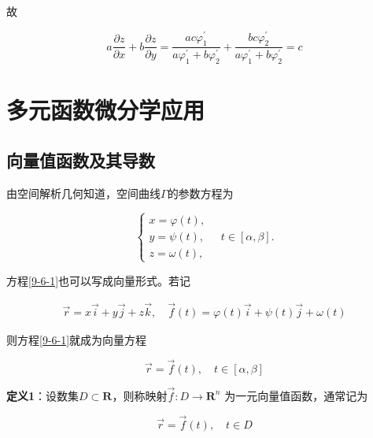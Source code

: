 \documentclass[12pt, a4paper]{article}
\numberwithin{equation}{section}
\begin{document}
    故

    $$
        a \frac{\partial z}{\partial x}+b \frac{\partial z}{\partial y}=
        \frac{a c \varphi_1^{\prime}}{a \varphi_1^{\prime}+b \varphi_2^{\prime}}+
        \frac{b c \varphi_2^{\prime}}{a \varphi_1^{\prime}+b \varphi_2^{\prime}}=c
    $$

\section{多元函数微分学应用}

\subsection{向量值函数及其导数}

    由空间解析几何知道，空间曲线\(\varGamma\)的参数方程为

    \begin{equation}
        \left\{\begin{array}{l}
            x=\varphi(t), \\
            y=\psi(t), \\
            z=\omega(t),
        \end{array} \quad t \in[\alpha, \beta]. \right.
        \label{9-6-1}
    \end{equation}

    方程\ref{9-6-1}也可以写成向量形式。若记

    \begin{align*}
        \overrightarrow{r} = x\overrightarrow{i} + y\overrightarrow{j} + z\overrightarrow{k}, \quad
        \overrightarrow{f}\left(t\right) = \varphi\left(t\right)\overrightarrow{i} +
            \psi\left(t\right)\overrightarrow{j} + \omega\left(t\right)
    \end{align*}

    则方程\ref{9-6-1}就成为向量方程

    \begin{equation}
        \overrightarrow{r} = \overrightarrow{f}\left(t\right),\quad t \in[\alpha, \beta]
    \end{equation}

    \textbf{定义1}：设数集\(D \subset \mathbf{R}\)，则称映射\(\overrightarrow{f}: D \rightarrow \mathbf{R}^n\)
    为一元向量值函数，通常记为

    \begin{equation}
        \overrightarrow{r} = \overrightarrow{f}\left(t\right),\quad t \in D
    \end{equation}
\end{document}
